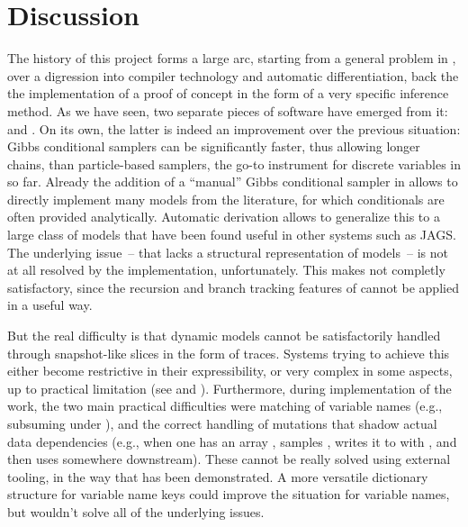 \chapter{Discussion}
\label{cha:discussion}

The history of this project forms a large arc, starting from a general problem in \turingjl{}, over
a digression into compiler technology and automatic differentiation, back the the implementation of
a proof of concept in the form of a very specific inference method.  As we have seen, two separate
pieces of software have emerged from it: \irtrackerjl{} and \autogibbsjl{}.  On its own, the latter
is indeed an improvement over the previous situation: Gibbs conditional samplers can be
significantly faster, thus allowing longer chains, than particle-based samplers, the go-to
instrument for discrete variables in \turingjl{} so far.  Already the addition of a \enquote{manual}
Gibbs conditional sampler in \turingjl{} allows to directly implement many models from the
literature, for which conditionals are often provided analytically.  Automatic derivation allows to
generalize this to a large class of models that have been found useful in other systems such as
JAGS.  The underlying issue~-- that \turingjl{} lacks a structural representation of models~-- is
not at all resolved by the implementation, unfortunately.  This makes \autogibbsjl{} not completly
satisfactory, since the recursion and branch tracking features of \irtrackerjl{} cannot be applied
in a useful way.

But the real difficulty is that dynamic models cannot be satisfactorily handled through
snapshot-like slices in the form of traces.  Systems trying to achieve this either become
restrictive in their expressibility, or very complex in some aspects, up to practical limitation
(see \textcite{mansinghka2014venture} and \textcite{goodman2012church}).  Furthermore, during
implementation of the work, the two main practical difficulties were matching of variable names
(e.g., subsuming  under ), and the correct handling of mutations
that shadow actual data dependencies (e.g., when one has an array , samples ,
writes it to  with , and then uses  somewhere
downstream).  These cannot be really solved using external tooling, in the way that has been
demonstrated.  A more versatile dictionary structure for variable name keys could improve the
situation for variable names, but wouldn't solve all of the underlying issues.

